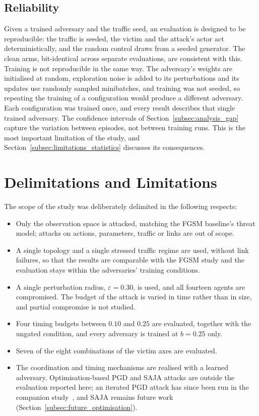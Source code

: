 \subsection{Reliability}
\label{subsec:validity_reliability}

Given a trained adversary and the traffic seed, an evaluation is designed to be
reproducible: the traffic is seeded, the victim and the attack's actor act
deterministically, and the random control draws from a seeded generator. The clean arms,
bit-identical across separate evaluations, are consistent with this. Training is not
reproducible in the same way. The adversary's weights are initialised
at random, exploration noise is added to its perturbations and its updates use randomly
sampled minibatches, and training was not seeded, so repeating the training of a
configuration would produce a different adversary. Each configuration was trained once,
and every result describes that single trained adversary. The confidence intervals of
Section~\ref{subsec:analysis_gap} capture the variation between episodes, not between
training runs. This is the most important limitation of the study, and
Section~\ref{subsec:limitations_statistics} discusses its consequences.

\section{Delimitations and Limitations}
\label{sec:delimitations}

The scope of the study was deliberately delimited in the following respects:
\begin{itemize}
  \item Only the observation space is attacked, matching the FGSM baseline's threat
        model; attacks on actions, parameters, traffic or links are out of scope.
  \item A single topology and a single stressed traffic regime are used, without link
        failures, so that the results are comparable with the FGSM study and the
        evaluation stays within the adversaries' training conditions.
  \item A single perturbation radius, $\varepsilon = 0.30$, is used, and all fourteen
        agents are compromised. The budget of the attack is varied in time rather than
        in size, and partial compromise is not studied.
  \item Four timing budgets between $0.10$ and $0.25$ are evaluated, together with the
        ungated condition, and every adversary is trained at $b = 0.25$ only.
  \item Seven of the eight combinations of the victim axes are evaluated.
  \item The coordination and timing mechanisms are realised with a learned adversary.
        Optimisation-based PGD and SAJA attacks are outside the evaluation reported
        here; an iterated PGD attack has since been run in the companion
        study~\cite{martins2026fgsm}, and SAJA remains future work
        (Section~\ref{subsec:future_optimisation}).
\end{itemize}

